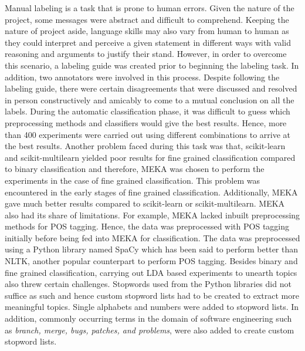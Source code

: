 \documentclass[a4paper,12pt,twoside]{report}
\begin{document}
\newline \newline
Manual labeling is a task that is prone to human errors. Given the nature of the project, some messages were abstract and difficult to comprehend. Keeping the nature of project aside, language skills may also vary from human to human as they could interpret and perceive a given statement in different ways with valid reasoning and arguments to justify their stand. However, in order to overcome this scenario, a labeling guide was created prior to beginning the labeling task. In addition, two annotators were involved in this process. Despite following the labeling guide, there were certain disagreements that were discussed and resolved in person constructively and amicably to come to a mutual conclusion on all the labels. 
\newline \newline
During the automatic classification phase, it was difficult to guess which preprocessing methods and classifiers would give the best results. Hence, more than 400 experiments were carried out using different combinations to arrive at the best results. Another problem faced during this task was that, scikit-learn and scikit-multilearn yielded poor results for fine grained classification compared to binary classification and therefore, MEKA was chosen to perform the experiments in the case of fine grained classification. This problem was encountered in the early stages of fine grained classification. Additionally, MEKA gave much better results compared to scikit-learn or scikit-multilearn. 
\newline \newline
MEKA also had its share of limitations. For example, MEKA lacked inbuilt preprocessing methods for \acs{POS} tagging. Hence, the data was preprocessed with \acs{POS} tagging initially before being fed into MEKA for classification. The data was preprocessed using a Python library named SpaCy which has been said to perform better than NLTK, another popular counterpart to perform \acs{POS} tagging. 
\newline \newline
Besides binary and fine grained classification, carrying out \acs{LDA} based experiments to unearth topics also threw certain challenges. Stopwords used from the Python libraries did not suffice as such and hence custom stopword lists had to be created to extract more meaningful topics. Single alphabets and numbers were added to stopword lists. In addition, commonly occurring terms in the domain of software engineering such as \textit{branch, merge, bugs, patches, and problems}, were also added to create custom stopword lists. 
\end{document}
